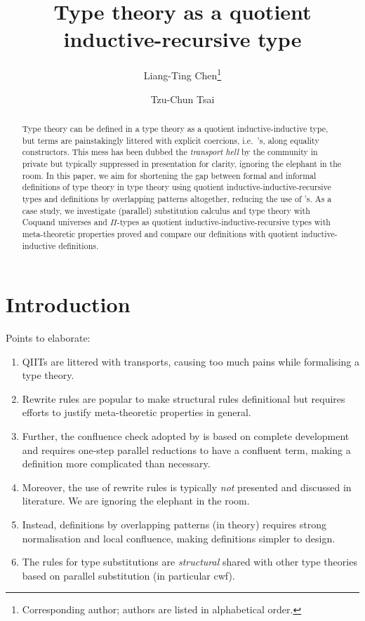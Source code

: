 \documentclass[a4paper,UKenglish,numberwithinsect,cleveref,thm-restate]{lipics-v2021}
\title{Type theory as a quotient inductive-recursive type}
\author{Liang-Ting Chen\footnote{Corresponding author; authors are listed in alphabetical order.}}{Institute of Information Science, Academia Sinica, Taiwan \and \url{http://l-tchen.github.io}}{ltchen@iis.sinica.edu.tw}{https://orcid.org/0000-0002-3250-1331}{Supported by the National Science and Technology Council of Taiwan under grant NSTC [funding].}
\author{Tzu-Chun Tsai}{Institute of Information Science, Academia Sinica, Taiwan}{gene0905@icloud.com}{}{Supported by the National Science and Technology Council of Taiwan under grant NSTC 112-2221-E-001-003-MY3.}
\begin{document}
\maketitle

\begin{abstract}
  Type theory can be defined in a type theory as a quotient inductive-inductive type, but terms are painstakingly littered with explicit coercions, i.e.\ \transp's, along equality constructors.
  This mess has been dubbed the \emph{transport hell} by the community in private but typically suppressed in presentation for clarity, ignoring the elephant in the room.
  In this paper, we aim for shortening the gap between formal and informal definitions of type theory in type theory using quotient inductive-inductive-recursive types and definitions by overlapping patterns altogether, reducing the use of \transp's.
  As a case study, we investigate (parallel) substitution calculus and type theory with Coquand universes and $\Pi$-types as quotient inductive-inductive-recursive types with meta-theoretic properties proved and compare our definitions with quotient inductive-inductive definitions.
\end{abstract}

\section{Introduction} \label{sec:intro}
Points to elaborate:
\begin{enumerate}
  \item QIITs are littered with transports, causing too much pains while formalising a type theory.
  \item Rewrite rules are popular to make structural rules definitional but requires efforts to justify meta-theoretic properties in general.
  \item Further, the confluence check adopted by \Agda is based on complete development and requires one-step parallel reductions to have a confluent term, making a definition more complicated than necessary.
  \item Moreover, the use of rewrite rules is typically \emph{not} presented and discussed in literature. We are ignoring the elephant in the room.
  \item Instead, definitions by overlapping patterns (in theory) requires strong normalisation and local confluence, making definitions simpler to design.
  \item The rules for type substitutions are \emph{structural} shared with other type theories based on parallel substitution (in particular cwf).
  
\end{enumerate}
\end{document}
